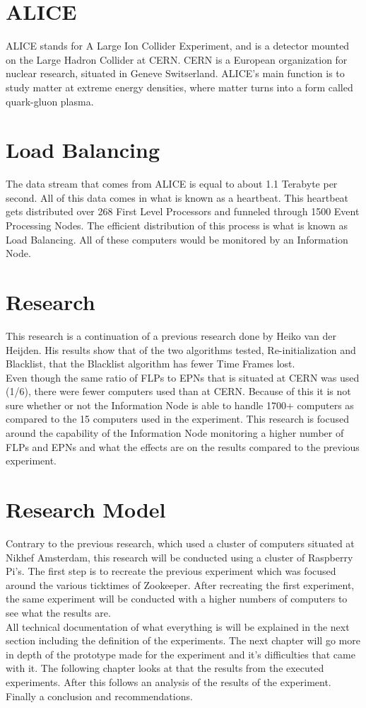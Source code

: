 \section{ALICE}
ALICE stands for A Large Ion Collider Experiment, and is a detector mounted on the Large Hadron Collider at CERN. CERN is a European organization for  nuclear research, situated in Geneve Switserland. ALICE's main function is to study matter at extreme energy densities, where matter turns into a form called quark-gluon plasma.

\section{Load Balancing}
The data stream that comes from ALICE is equal to about 1.1 Terabyte per second. All of this data comes in what is known as a heartbeat. This heartbeat gets distributed over 268 First Level Processors and funneled through	1500 Event Processing Nodes. The efficient distribution of this process is what is known as Load Balancing. All of these computers would be monitored by an Information Node.

\section{Research}
This research is a continuation of a previous research done by Heiko van der Heijden. His results show that of the two algorithms tested, Re-initialization and Blacklist, that the Blacklist algorithm has fewer Time Frames lost.\\
Even though the same ratio of FLPs to EPNs that is situated at CERN was used (1/6), there were fewer computers used than at CERN. Because of this it is not sure whether or not the Information Node is able to handle 1700+ computers as compared to the 15 computers used in the experiment. This research is focused around the capability of the Information Node monitoring a higher number of FLPs and EPNs and what the effects are on the results compared to the previous experiment.

\section{Research Model}
Contrary to the previous research, which used a cluster of computers situated at Nikhef Amsterdam, this research will be conducted using a cluster of Raspberry Pi's. The first step is to recreate the previous experiment which was focused around the various ticktimes of Zookeeper. After recreating the first experiment, the same experiment will be conducted with a higher numbers of computers to see what the results are. \\
All technical documentation of what everything is will be explained in the next section including the definition of the experiments.
The next chapter will go more in depth of the prototype made for the experiment and it's difficulties that came with it. The following chapter looks at that the results from the  executed experiments. After this follows an analysis of the results of the experiment. Finally a conclusion and recommendations.